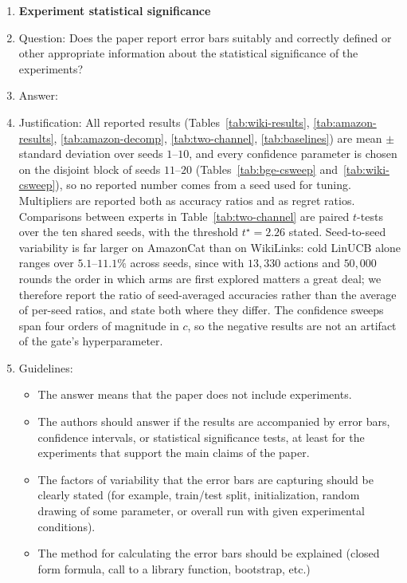 \documentclass{article}
\theoremstyle{definition}
\theoremstyle{remark}
\theoremstyle{remark}
\begin{document}
\begin{enumerate}
\item {\bf Experiment statistical significance}
    \item[] Question: Does the paper report error bars suitably and correctly defined or other appropriate information about the statistical significance of the experiments?
    \item[] Answer: \answerYes{} %
    \item[] Justification: All reported results (Tables~\ref{tab:wiki-results}, \ref{tab:amazon-results}, \ref{tab:amazon-decomp}, \ref{tab:two-channel}, \ref{tab:baselines}) are mean $\pm$ standard deviation over seeds $1$--$10$, and every confidence parameter is chosen on the disjoint block of seeds $11$--$20$ (Tables~\ref{tab:bge-csweep} and~\ref{tab:wiki-csweep}), so no reported number comes from a seed used for tuning. Multipliers are reported both as accuracy ratios and as regret ratios. Comparisons between experts in Table~\ref{tab:two-channel} are paired $t$-tests over the ten shared seeds, with the threshold $t^\star=2.26$ stated. Seed-to-seed variability is far larger on AmazonCat than on WikiLinks: cold LinUCB alone ranges over $5.1$--$11.1\%$ across seeds, since with $13{,}330$ actions and $50{,}000$ rounds the order in which arms are first explored matters a great deal; we therefore report the ratio of seed-averaged accuracies rather than the average of per-seed ratios, and state both where they differ. The confidence sweeps span four orders of magnitude in $c$, so the negative results are not an artifact of the gate's hyperparameter.
    \item[] Guidelines:
    \begin{itemize}
        \item The answer \answerNA{} means that the paper does not include experiments.
        \item The authors should answer \answerYes{} if the results are accompanied by error bars, confidence intervals, or statistical significance tests, at least for the experiments that support the main claims of the paper.
        \item The factors of variability that the error bars are capturing should be clearly stated (for example, train/test split, initialization, random drawing of some parameter, or overall run with given experimental conditions).
        \item The method for calculating the error bars should be explained (closed form formula, call to a library function, bootstrap, etc.)

\end{itemize}
\end{enumerate}
\end{document}
